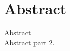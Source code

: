 \documentclass[Masterthesis.tex]{subfiles}
\begin{document}
\chapter*{Abstract}

Abstract\\

\noindent 
Abstract part 2.\\
\end{document}
